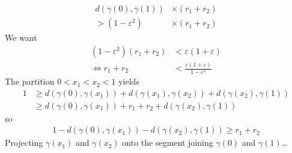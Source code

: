 \documentclass{article}
\begin{document}
	\begin{align*}
		d(\gamma(0),\gamma(1))&\times (r_1+r_2)\\
		>(1-\varepsilon^2)&\times (r_1+r_2)
	\end{align*}
	We want
	\begin{align*}
		(1-\varepsilon^2)(r_1+r_2)&<\varepsilon(1+\varepsilon)\\
		\iff r_1+r_2&<\frac{\varepsilon(1+\varepsilon)}{1-\varepsilon^2}
	\end{align*}
	\iffalse
	The partition $0<x_1<x_2<1$ yields
	\begin{align*}
		1&\geq d(\gamma(0),\gamma(x_1))+d(\gamma(x_1),\gamma(x_2))+d(\gamma(x_2),\gamma(1))\\
		&\geq d(\gamma(0),\gamma(x_1))+r_1+r_2+d(\gamma(x_2),\gamma(1))
	\end{align*}
	so
	\begin{align*}
		1-d(\gamma(0),\gamma(x_1))-d(\gamma(x_2),\gamma(1))\geq r_1+r_2
	\end{align*}
	Projecting $\gamma(x_1)$ and $\gamma(x_2)$ onto the segment joining $\gamma(0)$ and $\gamma(1)$…
	
\end{document}
